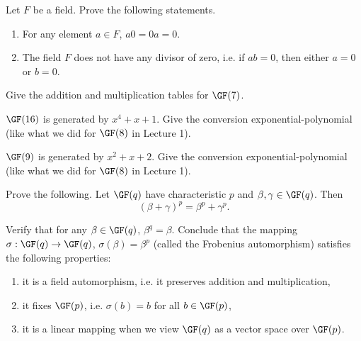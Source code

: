 \documentclass[a4paper, 11pt, openany]{book}
\begin{document}
\begin{exercise}
Let $F$ be a field. Prove the following statements.
\begin{enumerate}
    \item For any element $a \in F$, $a0 = 0a = 0$.

    \item The field $F$ does not have any divisor of zero, i.e. if $ab = 0$, then either $a=0$ or $b=0$.
\end{enumerate}
\end{exercise}

\begin{exercise}
Give the addition and multiplication tables for $\GF(7)$.
\end{exercise}

\begin{exercise}
$\GF(16)$ is generated by $x^4 + x + 1$. Give the conversion exponential-polynomial (like what we did for $\GF(8)$ in Lecture 1).
\end{exercise}


\begin{exercise}
$\GF(9)$ is generated by $x^2 + x + 2$. Give the conversion exponential-polynomial (like what we did for $\GF(8)$ in Lecture 1).
\end{exercise}



\begin{exercise}
Prove the following. Let $\GF(q)$ have characteristic $p$ and $\beta, \gamma \in \GF(q)$. Then
\[
	(\beta + \gamma)^p = \beta^p + \gamma^p.
\]
\end{exercise}

\begin{exercise}
Verify that for any $\beta \in \GF(q)$, $\beta^q = \beta$. Conclude that the mapping $\sigma: \GF(q) \to \GF(q)$, $\sigma(\beta) = \beta^p$ (called the Frobenius automorphism) satisfies the following properties:
\begin{enumerate}
    \item it is a field automorphism, i.e. it preserves addition and multiplication,

    \item it fixes $\GF(p)$, i.e. $\sigma(b) = b$ for all $b \in \GF(p)$,

    \item it is a linear mapping when we view $\GF(q)$ as a vector space over $\GF(p)$.
\end{enumerate}
\end{exercise}
\end{document}
